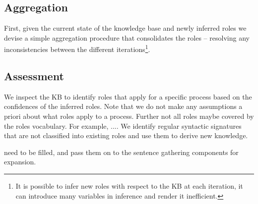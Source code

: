 \subsection{Aggregation}
First, given the current state of the knowledge base and newly inferred roles we devise a simple aggregation procedure that consolidates the roles -- resolving any inconsistencies between the different iterations\footnote{
It is possible to infer new roles with respect to the KB at each iteration, it can introduce many variables 
in inference and render it inefficient.
}.

\subsection{Assessment}

We inspect the KB to identify roles that apply for a specific process based on the confidences of the inferred roles. 
Note that we do not make any assumptions a priori about what roles apply to a process. 
Further not all roles maybe covered by the roles vocabulary. For example, ....
We identify regular syntactic signatures that are not classified into existing roles and use them to derive new knowledge.


need to be filled, and pass them on to the sentence gathering components for expansion.







